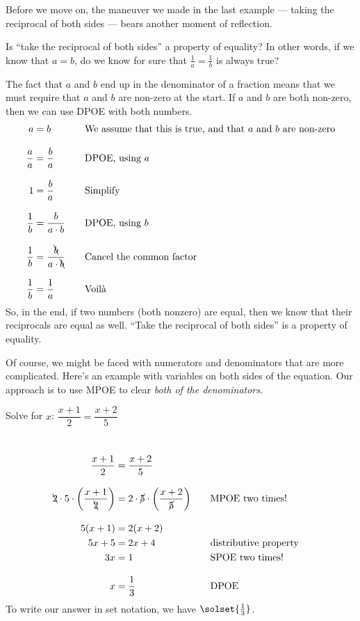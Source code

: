 Before we move on, the maneuver we made in the last example --- taking the reciprocal of both sides --- bears another moment of reflection.

\begin{boxeddef}
Is ``take the reciprocal of both sides'' a property of equality? In other words, if we know that $a = b$, do we know for sure that $\frac{1}{a} = \frac{1}{b}$ is always true?

The fact that $a$ and $b$ end up in the denominator of a fraction means that we must require that $a$ and $b$ are non-zero at the start. If $a$ and $b$ are both non-zero, then we can use DPOE with both numbers.
\[\begin{aligned}
a &= b
&&\text{\quad We assume that this is true, and that $a$ and $b$ are non-zero}
\\[2ex]
\frac{a}{a} &= \frac{b}{a}
&&\text{\quad DPOE, using $a$}
\\[2ex]
1 &= \frac{b}{a}
&&\text{\quad Simplify}
\\[2ex]
\frac{1}{b} &= \frac{b}{a\cdot b}
&&\text{\quad DPOE, using $b$}
\\[2ex]
\frac{1}{b} &= \frac{\bcancel{b}}{a\cdot \bcancel{b}}
&&\text{\quad Cancel the common factor}
\\[2ex]
\frac{1}{b} &= \frac{1}{a}
&&\text{\quad Voil\`a}
\end{aligned}\]
So, in the end, if two numbers (both nonzero) are equal, then we know that their reciprocals are equal as well. ``Take the reciprocal of both sides'' is a property of equality.
\end{boxeddef}

Of course, we might be faced with numerators and denominators that are more complicated. Here's an example with variables on both sides of the equation. Our approach is to use MPOE to clear \textit{both of the denominators}.

\begin{boxedex}
Solve for $x$: $\dfrac{x+1}{2}=\dfrac{x+2}{5}$

\exsoln\
\[\begin{aligned}
\dfrac{x+1}{2} &=\dfrac{x+2}{5}
\\[2ex]
\bcancel{2}\cdot5\cdot\left(\frac{x+1}{\bcancel{2}}\right) &=
2\cdot\cancel{5}\cdot\left(\frac{x+2}{\cancel{5}}\right)
&&\quad\text{MPOE two times!}
\\[2ex]
5(x+1) &= 2(x+2)
\\
5x+5 &= 2x+4
&&\quad\text{distributive property}
\\
3x &= 1
&&\quad\text{SPOE two times!}
\\[2ex]
x &= \dfrac{1}{3}
&&\quad\text{DPOE}
\end{aligned}\]
To write our answer in set notation, we have $\solset{\frac{1}{3}}$.
\end{boxedex}


